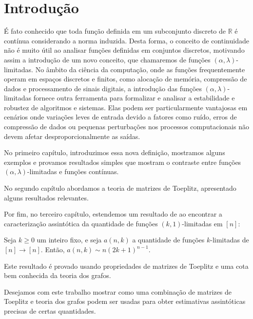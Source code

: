 \section*{Introdução}

%

\vspace{1cm}
\normalsize
É fato conhecido que toda função definida em um subconjunto discreto de $\mathbb{R}$ é contínua considerando a norma induzida. Desta forma, o conceito de continuidade não é muito útil ao analisar funções definidas em conjuntos discretos, motivando assim a introdução de um novo conceito, que chamaremos de funções $(\alpha,\lambda)$-limitadas. No âmbito da ciência da computação, onde as funções frequentemente operam em espaços discretos e finitos, como alocação de memória, compressão de dados e processamento de sinais digitais, a introdução das funções $(\alpha,\lambda)$-limitadas fornece outra ferramenta para formalizar e analisar a estabilidade e robustez de algoritmos e sistemas. Elas podem ser particularmente vantajosas em cenários onde variações leves de entrada devido a fatores como ruído, erros de compressão de dados ou pequenas perturbações nos processos computacionais não devem afetar desproporcionalmente as saídas.

No primeiro capítulo, introduzimos essa nova definição, mostramos alguns exemplos e provamos resultados simples que mostram o contraste entre funções $(\alpha,\lambda)$-limitadas e funções contínuas.

No segundo capítulo abordamos a teoria de matrizes de Toeplitz, apresentado alguns resultados relevantes.

Por fim, no terceiro capítulo, estendemos um resultado de \cite{coulson} ao encontrar a caracterização assintótica da quantidade de funções $(k,1)$-limitadas em $[n]$:

\begin{theorem*} Seja $k \ge 0$ um inteiro fixo, e seja $a(n, k)$ a quantidade de funções $k$-limitadas de $[n]\to[n]$. Então, $a(n,k) \sim n(2k+1)^{n-1}$. \end{theorem*}

Este resultado é provado usando propriedades de matrizes de Toeplitz e uma cota bem conhecida da teoria dos grafos.

Desejamos com este trabalho mostrar como uma combinação de matrizes de Toeplitz e teoria dos grafos podem ser usadas para obter estimativas assintóticas precisas de certas quantidades.
